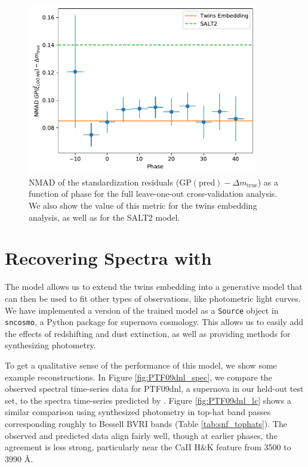 \begin{figure}
    \centering
    \includegraphics[width=0.9\textwidth]{figures/nn_twins/stand_err_vs_phase_loo.pdf}
    \caption{NMAD of the standardization residuals ($\textrm{GP}(\textrm{pred}) - \Delta m_\textrm{true}$) as a function of phase for the full leave-one-out cross-validation analysis. We also show the value of this metric for the twins embedding analysis, as well as for the SALT2 model.}
    \label{fig:stand_err_vs_phase_loo}
\end{figure}

\section{Recovering Spectra with \etos}
\label{sec:embed2spec_results}
The \etos{} model allows us to extend the twins embedding into a generative model that can then be used to fit other types of observations, like photometric light curves. We have implemented a version of the trained model as a \texttt{Source} object in \texttt{sncosmo}, a Python package for supernova cosmology. This allows us to easily add the effects of redshifting and dust extinction, as well as providing methods for synthesizing photometry.

To get a qualitative sense of the performance of this model, we show some example reconstructions. In Figure \ref{fig:PTF09dnl_spec}, we compare the observed spectral time-series data for PTF09dnl, a supernova in our held-out test set, to the spectra time-series predicted by \etos. Figure \ref{fig:PTF09dnl_lc} shows a similar comparison using synthesized photometry in top-hat band passes corresponding roughly to Bessell BVRI bands (Table \ref{tab:snf_tophats}). The observed and predicted data align fairly well, though at earlier phases, the agreement is less strong, particularly near the CaII H\&K feature from 3500 to 3990 \AA.

